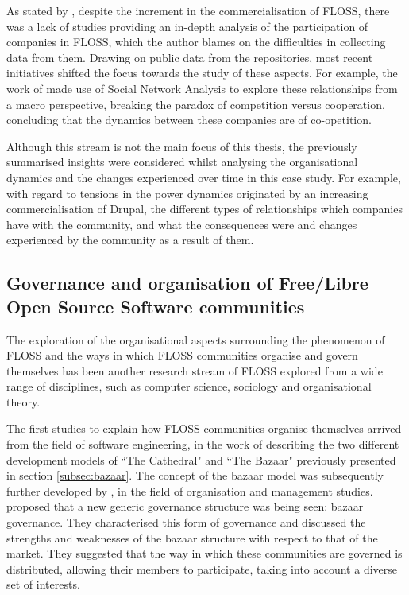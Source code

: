 As stated by \textcite{crowston2012free}, despite the increment in the commercialisation of FLOSS, there was a lack of studies providing an in-depth analysis of the participation of companies in FLOSS, which the author blames on the difficulties in collecting data from them. Drawing on public data from the repositories, most recent initiatives shifted the focus towards the study of these aspects. For example, the work of \textcite{teixeira2014collaboration, teixeira2015lessons, teixeira2016cooperation} made use of Social Network Analysis to explore these relationships from a macro perspective, breaking the paradox of competition versus cooperation, concluding that the dynamics between these companies are of co-opetition.  

Although this stream is not the main focus of this thesis, the previously summarised insights were considered whilst analysing the organisational dynamics and the changes experienced over time in this case study. For example, with regard to tensions in the power dynamics originated by an increasing commercialisation of Drupal, the different types of relationships which companies have with the community, and what the consequences were and changes experienced by the community as a result of them.

\subsection{Governance and organisation of Free\slash Libre Open Source Software communities}
\label{floss-governance}

The exploration of the organisational aspects surrounding the phenomenon of FLOSS and the ways in which FLOSS communities organise and govern themselves has been another research stream of FLOSS explored from a wide range of disciplines, such as computer science, sociology and organisational theory.

The first studies to explain how FLOSS communities organise themselves arrived from the field of software engineering, in the work of \textcite{Raymond2001} describing the two different development models of ``The Cathedral" and ``The Bazaar" previously presented in section \ref{subsec:bazaar}. The concept of the bazaar model was subsequently further developed by \textcite{Demil2006}, in the field of organisation and management studies. \textcite{Demil2006} proposed that a new generic governance structure was being seen: bazaar governance. They characterised this form of governance and discussed the strengths and weaknesses of the bazaar structure with respect to that of the market. They suggested that the way in which these communities are governed is distributed, allowing their members to participate, taking into account a diverse set of interests.

